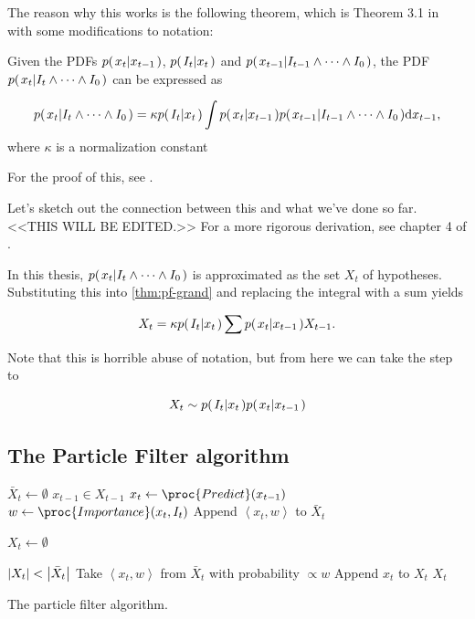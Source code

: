 The reason why this works is the following theorem, which is Theorem
3.1 in \cite{Hedvig} with some modifications to notation:

\begin{theorem}
  Given the PDFs $p{(\left. x_t \middle\vert x_{t-1} \right.)}$, $p{(\left. I_t \middle\vert x_t \right.)}$ and
  $p{(\left. x_{t-1} \middle\vert I_{t-1} \wedge \dots \wedge I_0 \right.)}$, the PDF
  $p{(\left. x_t \middle\vert I_t \wedge \dots \wedge I_0 \right.)}$ can be expressed as

\begin{equation}
  p{(\left. x_t \middle\vert I_t \wedge \dots \wedge I_0 \right.)} = \kappa p{(\left. I_t \middle\vert x_t \right.)} \int{ p{(\left. x_t \middle\vert x_{t-1} \right.)}p{(\left. x_{t-1} \middle\vert I_{t-1} \wedge \dots \wedge I_0 \right.)} \mathrm{d}x_{t-1}},
  \label{thm:pf-grand}
\end{equation}
where $\kappa$ is a normalization constant

For the proof of this, see \cite{Hedvig}.

\end{theorem}

Let's sketch out the connection between this and what we've done so
far. <<THIS WILL BE EDITED.>> For a more rigorous derivation, see chapter 4 of \cite{ProbRob}.

In this thesis, $p{(\left. x_t \middle\vert I_t \wedge \dots \wedge I_0 \right.)}$ is
approximated as the set $X_t$ of hypotheses. Substituting this into
\eqref{thm:pf-grand} and replacing the integral with a sum yields

\begin{equation}
  X_t = \kappa p{(\left. I_t \middle\vert x_t \right.)} \sum { p{(\left. x_t \middle\vert x_{t-1} \right.)} X_{t-1} }.
\end{equation}

Note that this is horrible abuse of notation, but from here we can
take the step to

\begin{equation}
  X_t \sim p{(\left. I_t \middle\vert x_t \right.)} p{(\left. x_t \middle\vert x_{t-1} \right.)}
\end{equation}

\subsection{The Particle Filter algorithm}
\begin{table}
  \begin{codebox}
    \li $\bar{X}_t \gets \emptyset$
    \li \ForEach $x_{t-1} \in X_{t-1}$
    \li \Do
    \li $x_t \gets \proc{Predict}(x_{t-1})$
    \li $w \gets \proc{Importance}(x_t,I_t)$
    \li Append $\left<x_t, w\right>$ to $\bar{X}_t$
    \End
    \li
    
    \li $X_t \gets \emptyset$
    
    \li \While $\left\vert X_t \right\vert < \left\vert \bar{X}_t \right\vert$
    \li \Do
    \li Take $\left<x_t, w\right>$ from $\bar{X}_t$ with probability $\propto w$
    \li Append $x_t$ to $X_t$
    \End
    \li \Return $X_t$
  \end{codebox}
  \caption{The particle filter algorithm.}
  \label{alg:pf}
\end{table}

